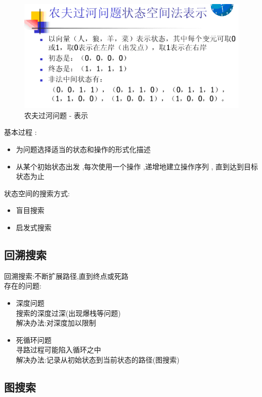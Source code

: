 \documentclass[UTF8,a4paper]{ctexart}
\begin{document}
\begin{figure}[H]
	\centering
	\includegraphics[scale = 0.6]{assets/ArtificialIntelligence_e824b.png}
	\caption{农夫过河问题 - 表示}
\end{figure}

基本过程 :
\begin{itemize}
	\item 为问题选择适当的状态和操作的形式化描述
	\item 从某个初始状态出发 ,每次使用一个操作 ,递增地建立操作序列 , 直到达到目标状态为止
\end{itemize}

状态空间的搜索方式:
\begin{itemize}
	\item 盲目搜索
	\item 启发式搜索
\end{itemize}

\subsection{回溯搜索}

回溯搜索:不断扩展路径,直到终点或死路\\
存在的问题:
\begin{itemize}
	\item 深度问题\\
	      搜索的深度过深(出现爆栈等问题)\\
	      解决办法:对深度加以限制
	\item 死循环问题\\
	      寻路过程可能陷入循环之中\\
	      解决办法:记录从初始状态到当前状态的路径(图搜索)
\end{itemize}

\subsection{图搜索}
\end{document}
